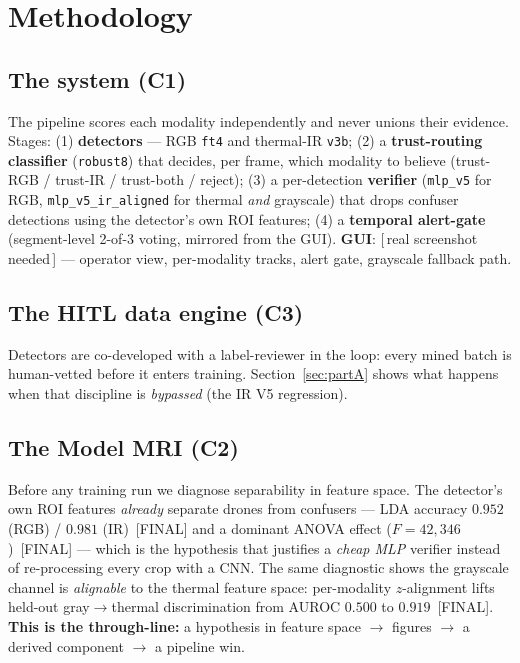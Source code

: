 \documentclass[11pt]{article}
\newcommand{\final}{{\small\textcolor{green!45!black}{[FINAL]}}}
\newcommand{\todo}[1]{{\small\textcolor{red!70!black}{[\,#1\,]}}}
\begin{document}
\section{Methodology}
\label{sec:method}

\subsection{The system (C1)}
The pipeline scores each modality independently and never unions their evidence. Stages:
(1) \textbf{detectors} --- RGB \texttt{ft4} and thermal-IR \texttt{v3b}; (2) a \textbf{trust-routing
classifier} (\texttt{robust8}) that decides, per frame, which modality to believe
(trust-RGB / trust-IR / trust-both / reject); (3) a per-detection \textbf{verifier}
(\texttt{mlp\_v5} for RGB, \texttt{mlp\_v5\_ir\_aligned} for thermal \emph{and} grayscale) that
drops confuser detections using the detector's own ROI features; (4) a \textbf{temporal alert-gate}
(segment-level 2-of-3 voting, mirrored from the GUI). \textbf{GUI}: \todo{real screenshot needed} ---
operator view, per-modality tracks, alert gate, grayscale fallback path.

\subsection{The HITL data engine (C3)}
Detectors are co-developed with a label-reviewer in the loop: every mined batch is human-vetted
before it enters training. Section~\ref{sec:partA} shows what happens when that discipline is
\emph{bypassed} (the IR V5 regression).

\subsection{The Model MRI (C2)}
Before any training run we diagnose separability in feature space. The detector's own ROI features
\emph{already} separate drones from confusers --- LDA accuracy
$0.952$ (RGB) / $0.981$ (IR)~\final{} %
and a dominant ANOVA effect ($F=42{,}346$)~\final{} %
--- which is the hypothesis that justifies a \emph{cheap MLP} verifier instead of re-processing
every crop with a CNN. The same diagnostic shows the grayscale channel is \emph{alignable} to the
thermal feature space: per-modality $z$-alignment lifts held-out gray$\rightarrow$thermal
discrimination from AUROC $0.500$ to $0.919$~\final{}. %
\textbf{This is the through-line:} a hypothesis in feature space $\rightarrow$ figures $\rightarrow$
a derived component $\rightarrow$ a pipeline win.
\end{document}
